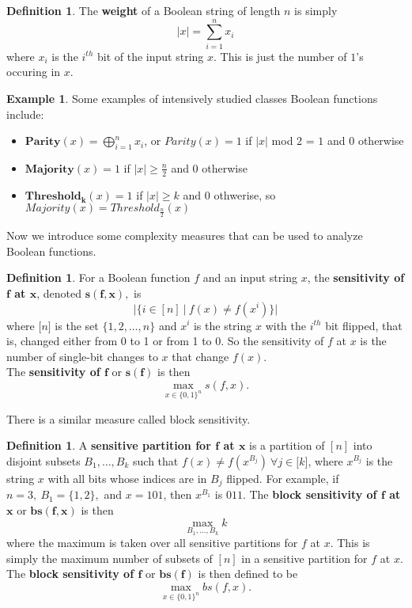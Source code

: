 \documentclass[psamsfonts]{amsart}
\theoremstyle{definition}
\newtheorem{defn}[thm]{Definition}
\newtheorem{exmp}[thm]{Example}
\theoremstyle{remark}
\numberwithin{equation}{section}
\begin{document}
\begin{defn}\label{weight}
The \textbf{weight} of a Boolean string of length $n$ is simply $$|x|=\sum_{i=1}^{n} x_{i}$$ where $x_{i}$ is the $i^{th}$ bit of the input string $x$.  This is just the number of $1$'s 
occuring in $x$.  
\end{defn}

\begin{exmp}\label{booleanexamples}
Some examples of intensively studied classes Boolean functions include:
\begin{itemize}
\item $\textbf{Parity}(x) = \bigoplus_{i=1}^{n} x_{i}$, or $Parity(x) = 1$ if $|x|$  mod  2 = $1$ and $0$ otherwise
\item $\textbf{Majority}(x) = 1$ if $|x| \geq \frac{n}{2}$ and 0 otherwise
\item $\textbf{Threshold}_{\textbf{k}}(x) = 1$ if $|x| \geq k$ and 0 othwerise, so \\ $Majority(x)=Threshold_{\frac{n}{2}}(x)$
\end{itemize}
\end{exmp}


Now we introduce some complexity measures that can be used to analyze Boolean functions.  

\begin{defn}\label{sensitivity}
For a Boolean function $f$ and an input string $x$, the \textbf{sensitivity of $\boldsymbol{f}$ at $\boldsymbol{x}$}, 
denoted $\boldsymbol{s(f,x)},$ is $$|\{i \in [n] \: | \: f(x) \neq f(x^{i})\}|$$ where 
$\lbrack n \rbrack$ is the set 
$\{1,2,\ldots ,n\}$ and 
$x^{i}$ is the string $x$ with the $i^{th}$ bit flipped, 
that is, changed either from 0 to 1 or from 1 to 0.  So the sensitivity of $f$ at $x$ is the number of single-bit changes to $x$ that change $f(x)$.  
\\
The \textbf{sensitivity of $\boldsymbol{f}$} or $\boldsymbol{s(f)}$ is then $$\max\limits_{x \in \{0,1\}^{n}} s(f,x).$$
\end{defn}

There is a similar measure called block sensitivity.  
\begin{defn}\label{blocksensitivity}
A \textbf{sensitive partition for $\boldsymbol{f}$ at $\boldsymbol{x}$} is a partition of $[n]$ into disjoint subsets $B_{1}, \ldots , B_{k}$ such that 
$f(x) \neq f(x^{B_{j}}) \: \forall j \in \lbrack k \rbrack$, where $x^{B_{j}}$ is the string $x$ with all bits whose indices are in $B_{j}$ flipped.  
For example, if $n=3, \: B_{1} = \{1,2\},$ and $x=101$, then $x^{B_{1}}$ is $011$.  
The \textbf{block sensitivity of $\boldsymbol{f}$ at $\boldsymbol{x}$} or $\boldsymbol{bs(f,x)}$ is then
$$ \max_{B_{1}, \ldots , B_{k}} k$$ 
where the maximum is taken over all sensitive partitions for $f$ at $x$.  This is simply the maximum number of subsets of $[n]$ in a sensitive partition for $f$ at $x$.
The \textbf{block sensitivity of $\boldsymbol{f}$} or $\boldsymbol{bs(f)}$ is then defined to be
$$ \max\limits_{x \in \{0,1\}^{n}} bs(f,x).$$
\end{defn}
\end{document}

